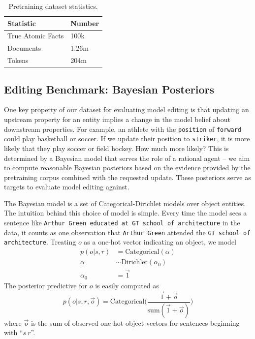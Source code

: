 \documentclass[11pt,a4paper]{article}
\begin{document}
\begin{table}[h]
  \centering
\begin{tabular}{ll}
  \hline
  Statistic & Number \\
  \hline
  True Atomic Facts & 100k \\  
  Documents & 1.26m \\
  Tokens & 204m \\
  \hline
\end{tabular}
\vspace{-3pt}
\caption{Pretraining dataset statistics.}
\label{tab:dataset_stats}
\end{table}

\subsection{Editing Benchmark: Bayesian Posteriors}
\label{sec:bayesian_model}

One key property of our dataset for evaluating model editing is that updating an upstream property for an entity implies a change in the model belief about downstream properties.
For example, an athlete with the \texttt{position} of \texttt{forward} could play basketball or soccer. If we update their position to \texttt{striker}, it is more likely that they play soccer or field hockey. How much more likely? This is determined by a Bayesian model that serves the role of a rational agent -- we aim to compute reasonable Bayesian posteriors based on the evidence provided by the pretraining corpus combined with the requested update. These posteriors serve as targets to evaluate model editing against. 

The Bayesian model is a set of Categorical-Dirichlet models over object entities. The intuition behind this choice of model is simple. Every time the model sees a sentence like \texttt{Arthur Green educated at GT school of architecture}
in the data, it counts as one observation that \texttt{Arthur Green} attended the \texttt{GT school of architecture}. Treating $o$ as a one-hot vector indicating an object, we model 
\vspace{-3pt}
\begin{align*}
    p(o|s,r) &= \textrm{Categorical}(\alpha) \\
    \alpha &\sim \textrm{Dirichlet}(\alpha_0) \\
    \alpha_0 &= \vec{1}
\end{align*}
\vspace{-3pt}
\noindent The posterior predictive for $o$ is easily computed as 
$$p(o|s,r,\vec{o}) = \textrm{Categorical}\Big(\frac{\vec{1} + \vec{o}}{\textrm{sum}(\vec{1} + \vec{o})}\Big)$$ 
\noindent where $\vec{o}$ is the sum of observed one-hot object vectors for sentences beginning with ``$s \ r$''. 
\end{document}
